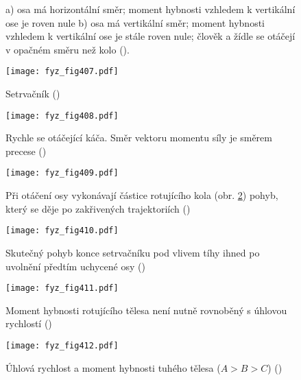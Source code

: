   \begin{figure}[ht!] %
    \centering
    \caption{a) osa má horizontální směr; moment hybnosti vzhledem k vertikální ose je roven nule 
             b) osa má vertikální směr; moment hybnosti vzhledem k vertikální ose je stále roven 
             nule; člověk a žídle se otáčejí v opačném směru než kolo
             (\cite[s.~278]{Feynman01}).}
    \label{fyz:fig406}
  \end{figure}

  \begin{figure}[ht!] %
    \centering
    \texttt{[image: fyz\_fig407.pdf]}
    \caption{Setrvačník
             (\cite[s.~279]{Feynman01})}
    \label{fyz:fig407}
  \end{figure}

  \begin{figure}[ht!] %
    \centering
    \texttt{[image: fyz\_fig408.pdf]}
    \caption{Rychle se otáčející káča. Směr vektoru momentu síly je směrem precese 
             (\cite[s.~280]{Feynman01})}
    \label{fyz:fig408}
  \end{figure}

  \begin{figure}[ht!] %
    \centering
    \texttt{[image: fyz\_fig409.pdf]}
    \caption{Při otáčení osy vykonávají částice rotujícího kola (obr. \ref{fyz:fig407}) pohyb, 
             který se děje po zakřivených trajektoriích 
             (\cite[s.~280]{Feynman01})}
    \label{fyz:fig409}
  \end{figure}

  \begin{figure}[ht!] %
    \centering
    \texttt{[image: fyz\_fig410.pdf]}
    \caption{Skutečný pohyb konce setrvačníku pod vlivem tíhy ihned po uvolnění předtím uchycené osy
             (\cite[s.~281]{Feynman01})}
    \label{fyz:fig410}
  \end{figure}

  \begin{figure}[ht!] %
    \centering
    \texttt{[image: fyz\_fig411.pdf]}
    \caption{Moment hybnosti rotujícího tělesa není nutně rovnoběný s úhlovou rychlostí
             (\cite[s.~282]{Feynman01})}
    \label{fyz:fig411}
  \end{figure}

  \begin{figure}[ht!] %
    \centering
    \texttt{[image: fyz\_fig412.pdf]}
    \caption{Úhlová rychlost a moment hybnosti tuhého tělesa (\(A>B>C\))
             (\cite[s.~283]{Feynman01})}
    \label{fyz:fig412}
  \end{figure}


